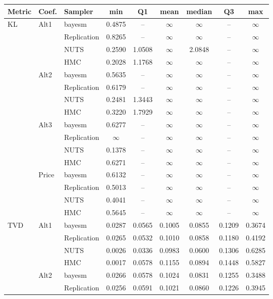 \begin{tabular}{lllcccccc}
\toprule
Metric & Coef. & Sampler & min & Q1 & mean & median & Q3 & max \\
\midrule
KL & Alt1 & bayesm & 0.4875 & {--} & $\infty$ & $\infty$ & {--} & $\infty$ \\
 &  & Replication & 0.8265 & {--} & $\infty$ & $\infty$ & {--} & $\infty$ \\
 &  & NUTS & 0.2590 & 1.0508 & $\infty$ & 2.0848 & {--} & $\infty$ \\
 &  & HMC & 0.2028 & 1.1768 & $\infty$ & $\infty$ & {--} & $\infty$ \\
 & Alt2 & bayesm & 0.5635 & {--} & $\infty$ & $\infty$ & {--} & $\infty$ \\
 &  & Replication & 0.6179 & {--} & $\infty$ & $\infty$ & {--} & $\infty$ \\
 &  & NUTS & 0.2481 & 1.3443 & $\infty$ & $\infty$ & {--} & $\infty$ \\
 &  & HMC & 0.3220 & 1.7929 & $\infty$ & $\infty$ & {--} & $\infty$ \\
 & Alt3 & bayesm & 0.6277 & {--} & $\infty$ & $\infty$ & {--} & $\infty$ \\
 &  & Replication & $\infty$ & {--} & $\infty$ & $\infty$ & {--} & $\infty$ \\
 &  & NUTS & 0.1378 & {--} & $\infty$ & $\infty$ & {--} & $\infty$ \\
 &  & HMC & 0.6271 & {--} & $\infty$ & $\infty$ & {--} & $\infty$ \\
 & Price & bayesm & 0.6132 & {--} & $\infty$ & $\infty$ & {--} & $\infty$ \\
 &  & Replication & 0.5013 & {--} & $\infty$ & $\infty$ & {--} & $\infty$ \\
 &  & NUTS & 0.4041 & {--} & $\infty$ & $\infty$ & {--} & $\infty$ \\
 &  & HMC & 0.5645 & {--} & $\infty$ & $\infty$ & {--} & $\infty$ \\
TVD & Alt1 & bayesm & 0.0287 & 0.0565 & 0.1005 & 0.0855 & 0.1209 & 0.3674 \\
 &  & Replication & 0.0265 & 0.0532 & 0.1010 & 0.0858 & 0.1180 & 0.4192 \\
 &  & NUTS & 0.0026 & 0.0336 & 0.0983 & 0.0600 & 0.1306 & 0.6285 \\
 &  & HMC & 0.0017 & 0.0578 & 0.1155 & 0.0894 & 0.1448 & 0.5827 \\
 & Alt2 & bayesm & 0.0266 & 0.0578 & 0.1024 & 0.0831 & 0.1255 & 0.3488 \\
 &  & Replication & 0.0256 & 0.0591 & 0.1021 & 0.0860 & 0.1226 & 0.3945 \\

\end{tabular}

